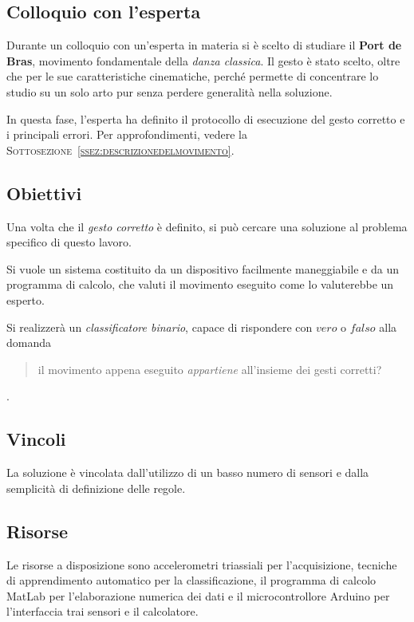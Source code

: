 \vspace{12pt}



\subsection{Colloquio con l'esperta}
Durante un colloquio con un'esperta in materia
si è scelto di studiare il \textbf{Port de Bras},
movimento fondamentale della \emph{danza classica}.
Il gesto è stato scelto,
oltre che per le sue caratteristiche cinematiche,
perché permette di concentrare lo studio su un solo arto
pur senza perdere generalità nella soluzione.

In questa fase, l'esperta ha definito il protocollo di esecuzione
del gesto corretto e i principali errori.
Per approfondimenti, vedere la \textsc{Sottosezione~\ref{ssez:descrizionedelmovimento}}.




\subsection{Obiettivi}
Una volta che il \emph{gesto corretto} è definito,
si può cercare una soluzione al problema specifico di questo lavoro.

Si vuole un sistema
costituito da un dispositivo facilmente maneggiabile
e da un programma di calcolo,
che valuti il movimento eseguito
come lo valuterebbe un esperto.

Si realizzerà un \emph{classificatore binario},
capace di rispondere con $vero$ o $falso$
alla domanda
\begin{quote}
il movimento appena eseguito \emph{appartiene} all'insieme dei gesti corretti?
\end{quote}.




\subsection{Vincoli}
La soluzione è vincolata dall'utilizzo di un basso numero di sensori
e dalla semplicità di definizione delle regole.




\subsection{Risorse}

Le risorse a disposizione sono accelerometri triassiali per l'acquisizione,
tecniche di apprendimento automatico per la classificazione,
il programma di calcolo MatLab per l'elaborazione numerica dei dati
e il microcontrollore Arduino per l'interfaccia trai sensori e il calcolatore.
